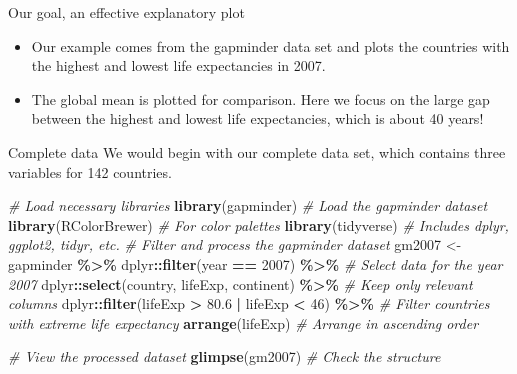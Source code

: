 \documentclass[
  ignorenonframetext,
]{beamer}
\newenvironment{Shaded}{\begin{snugshade}}{\end{snugshade}}
\newcommand{\CommentTok}[1]{\textcolor[rgb]{0.56,0.35,0.01}{\textit{#1}}}
\newcommand{\DecValTok}[1]{\textcolor[rgb]{0.00,0.00,0.81}{#1}}
\newcommand{\FloatTok}[1]{\textcolor[rgb]{0.00,0.00,0.81}{#1}}
\newcommand{\FunctionTok}[1]{\textcolor[rgb]{0.13,0.29,0.53}{\textbf{#1}}}
\newcommand{\NormalTok}[1]{#1}
\newcommand{\OtherTok}[1]{\textcolor[rgb]{0.56,0.35,0.01}{#1}}
\newcommand{\SpecialCharTok}[1]{\textcolor[rgb]{0.81,0.36,0.00}{\textbf{#1}}}
\begin{document}
\begin{frame}{Our goal, an effective explanatory plot}
\label{our-goal-an-effective-explanatory-plot-1}
\begin{itemize}
\item
  Our example comes from the gapminder data set and plots the countries
  with the highest and lowest life expectancies in 2007.
\item
  The global mean is plotted for comparison. Here we focus on the large
  gap between the highest and lowest life expectancies, which is about
  40 years!
\end{itemize}
\end{frame}

\begin{frame}[fragile]{Complete data}
\label{complete-data}
We would begin with our complete data set, which contains three
variables for 142 countries.


\begin{Shaded}
\begin{Highlighting}[]
\CommentTok{\# Load necessary libraries}
\FunctionTok{library}\NormalTok{(gapminder)    }\CommentTok{\# Load the gapminder dataset}
\FunctionTok{library}\NormalTok{(RColorBrewer) }\CommentTok{\# For color palettes}
\FunctionTok{library}\NormalTok{(tidyverse)    }\CommentTok{\# Includes dplyr, ggplot2, tidyr, etc.}
\CommentTok{\# Filter and process the gapminder dataset}
\NormalTok{gm2007 }\OtherTok{\textless{}{-}}\NormalTok{ gapminder }\SpecialCharTok{\%\textgreater{}\%}
\NormalTok{  dplyr}\SpecialCharTok{::}\FunctionTok{filter}\NormalTok{(year }\SpecialCharTok{==} \DecValTok{2007}\NormalTok{) }\SpecialCharTok{\%\textgreater{}\%}                   \CommentTok{\# Select data for the year 2007}
\NormalTok{  dplyr}\SpecialCharTok{::}\FunctionTok{select}\NormalTok{(country, lifeExp, continent) }\SpecialCharTok{\%\textgreater{}\%}     \CommentTok{\# Keep only relevant columns}
\NormalTok{  dplyr}\SpecialCharTok{::}\FunctionTok{filter}\NormalTok{(lifeExp }\SpecialCharTok{\textgreater{}} \FloatTok{80.6} \SpecialCharTok{|}\NormalTok{ lifeExp }\SpecialCharTok{\textless{}} \DecValTok{46}\NormalTok{) }\SpecialCharTok{\%\textgreater{}\%}   \CommentTok{\# Filter countries with extreme life expectancy}
  \FunctionTok{arrange}\NormalTok{(lifeExp)                            }\CommentTok{\# Arrange in ascending order}

\CommentTok{\# View the processed dataset}
\FunctionTok{glimpse}\NormalTok{(gm2007)  }\CommentTok{\# Check the structure}
\end{Highlighting}
\end{Shaded}


\end{frame}
\end{document}

